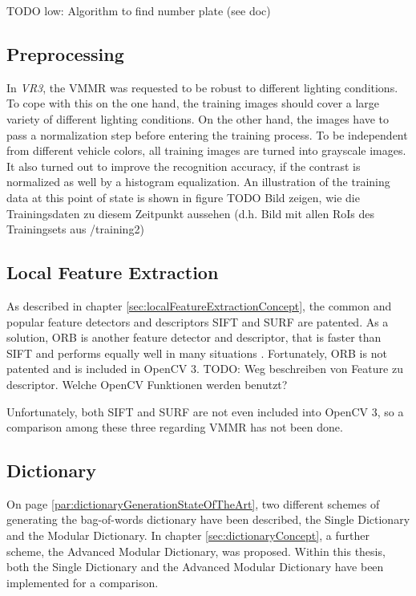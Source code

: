 TODO low: Algorithm to find number plate (see doc)

\subsection{Preprocessing}\label{sec:preprocessingImpl}
In \emph{VR3}, the VMMR was requested to be robust to different lighting conditions. To cope with this on the one hand, the training images should cover a large variety of different lighting conditions. On the other hand, the images have to pass a normalization step before entering the training process. To be independent from different vehicle colors, all training images are turned into grayscale images. It also turned out to improve the recognition accuracy, if the contrast is normalized as well by a histogram equalization. An illustration of the training data at this point of state is shown in figure TODO Bild zeigen, wie die Trainingsdaten zu diesem Zeitpunkt aussehen (d.h. Bild mit allen RoIs des Trainingsets aus /training2)

\subsection{Local Feature Extraction}\label{sec:localFeatureExtractionImpl}
As described in chapter \ref{sec:localFeatureExtractionConcept}, the common and popular feature detectors and descriptors SIFT and SURF are patented. As a solution, ORB is another feature detector and descriptor, that is faster than SIFT and performs equally well in many situations \citep{rublee2011orb}. Fortunately, ORB is not patented and is included in OpenCV 3. TODO: Weg beschreiben von Feature zu descriptor. Welche OpenCV Funktionen werden benutzt?

Unfortunately, both SIFT and SURF are not even included into OpenCV 3, so a comparison among these three regarding VMMR has not been done.

\subsection{Dictionary}\label{sec:dictionaryImpl}
On page \ref{par:dictionaryGenerationStateOfTheArt}, two different schemes of generating the bag-of-words dictionary have been described, the Single Dictionary and the Modular Dictionary. In chapter \ref{sec:dictionaryConcept}, a further scheme, the Advanced Modular Dictionary, was proposed. Within this thesis, both the Single Dictionary and the Advanced Modular Dictionary have been implemented for a comparison.

